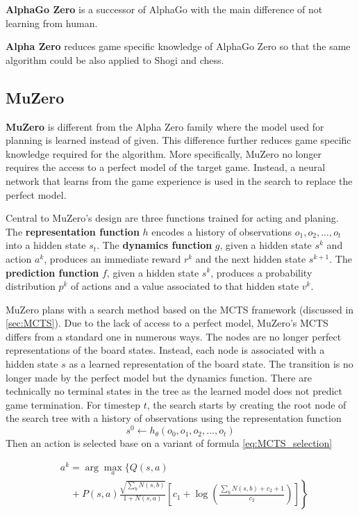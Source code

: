\documentclass[12pt]{article}
\newcommand{\note}[1]{\todo[color=yellow!40,bordercolor=none,linecolor=black]{#1}}
\begin{document}
\textbf{AlphaGo Zero} is a successor of AlphaGo with the main difference of not learning from human.

\textbf{Alpha Zero} reduces game specific knowledge of AlphaGo Zero so that the same algorithm could be also applied to Shogi and chess.


\subsection{MuZero}
\textbf{MuZero} is different from the Alpha Zero family where the model used for planning is learned instead of given.
This difference further reduces game specific knowledge required for the algorithm.
More specifically, MuZero no longer requires the access to a perfect model of the target game.
Instead, a neural network that learns from the game experience is used in the search to replace the perfect model.

Central to MuZero's design are three functions trained for acting and planing.
The \textbf{representation function} $h$ encodes a history of observations $o_1, o_2, ..., o_t$ into a hidden state $s_t$.
The \textbf{dynamics function} $g$, given a hidden state $s^k$ and action $a^k$, produces an immediate reward $r^k$ and the next hidden state $s^{k+1}$.
The \textbf{prediction function} $f$, given a hidden state $s^k$, produces a probability distribution $p^k$ of actions and a value associated to that hidden state $v^k$.

MuZero plans with a search method based on the MCTS framework (discussed in \ref{sec:MCTS}).
Due to the lack of access to a perfect model, MuZero's MCTS differs from a standard one in numerous ways.
The nodes are no longer perfect representations of the board states.
Instead, each node is associated with a hidden state $s$ as a learned representation of the board state.
The transition is no longer made by the perfect model but the dynamics function.
There are technically no terminal states in the tree as the learned model does not predict game termination.
For timestep $t$, the search starts by creating the root node of the search tree with a history of observations
using the representation function
\begin{equation*}
    s^0 \leftarrow h_{\theta}(o_0, o_1, o_2, ..., o_t)
\end{equation*}
Then an action is selected base on a variant of formula \ref{eq:MCTS_selection}

\begin{equation}
    \begin{aligned}
         & a^{k}=\arg \max _{a}\{Q(s, a)                                                                                                                    \\
         & \left.\quad+P(s, a) \frac{\sqrt{\sum_{b} N(s, b)}}{1+N(s, a)}\left[c_{1}+\log \left(\frac{\sum_{b} N(s, b)+c_{2}+1}{c_{2}}\right)\right]\right\}
    \end{aligned}
\end{equation}
\end{document}
